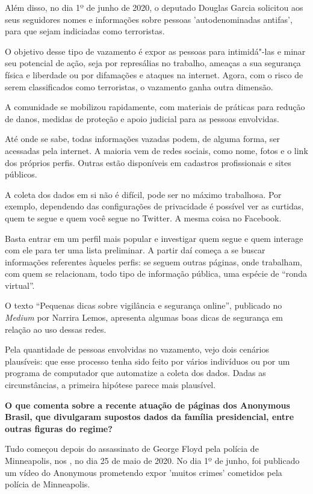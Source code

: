 Além disso, no dia 1º de junho de 2020, o deputado Douglas Garcia
solicitou aos seus seguidores nomes e informações sobre pessoas
'autodenominadas antifas', para que sejam indiciadas como terroristas.

O objetivo desse tipo de vazamento é expor as pessoas para intimidá"-las
e minar seu potencial de ação, seja por represálias no trabalho, ameaças
a sua segurança física e liberdade ou por difamações e ataques na
internet. Agora, com o risco de serem classificados como terroristas, o
vazamento ganha outra dimensão.

A comunidade se mobilizou rapidamente, com materiais de práticas para
redução de danos, medidas de proteção e apoio judicial para as pessoas
envolvidas.

Até onde se sabe, todas informações vazadas podem, de alguma forma, ser
acessadas pela internet. A maioria vem de redes sociais, como nome,
fotos e o link dos próprios perfis. Outras estão disponíveis em
cadastros profissionais e sites públicos.

A coleta dos dados em si não é difícil, pode ser no máximo trabalhosa.
Por exemplo, dependendo das configurações de privacidade é possível ver
as curtidas, quem te segue e quem você segue no Twitter. A mesma coisa
no Facebook.

Basta entrar em um perfil mais popular e investigar quem segue e quem
interage com ele para ter uma lista preliminar. A partir daí começa a se
buscar informações referentes àqueles perfis: se seguem outras páginas,
onde trabalham, com quem se relacionam, todo tipo de informação pública,
uma espécie de ``ronda virtual''.

O texto ``Pequenas dicas sobre vigilância e segurança online'', publicado no \emph{Medium} por Narrira Lemos, apresenta algumas boas dicas de segurança em relação ao uso
dessas redes.

Pela quantidade de pessoas envolvidas no vazamento, vejo dois cenários
plausíveis: que esse processo tenha sido feito por vários indivíduos ou
por um programa de computador que automatize a coleta dos dados. Dadas
as circunstâncias, a primeira hipótese parece mais plausível.

\bigskip

\noindent{}\textbf{O que comenta sobre a recente atuação de páginas dos Anonymous
Brasil, que divulgaram supostos dados da família presidencial, entre
outras figuras do regime?}

Tudo começou depois do assassinato de George Floyd
pela polícia de Minneapolis, nos , no dia 25 de maio de 2020. No dia
1º de junho, foi publicado um vídeo do Anonymous prometendo expor
'muitos crimes' cometidos pela polícia de Minneapolis.

